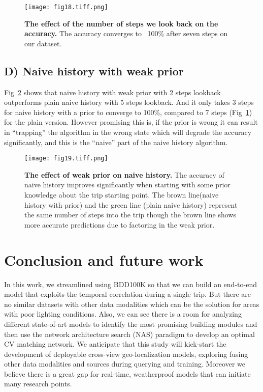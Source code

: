 \documentclass[10pt,letterpaper]{article}
\begin{document}
\begin{figure}[!ht]
  \caption{{\bf The effect of the number of steps we look back on the accuracy.} The accuracy converges to ~100\% after seven steps on our dataset.}
  \texttt{[image: fig18.tiff.png]}
  \label{fig18}
\end{figure}
\FloatBarrier

\subsection*{D) Naive history with weak prior}
Fig~\ref{fig19} shows that naive history with weak prior with 2 steps lookback outperforms plain naive history with 5 steps lookback. And it only takes 3 steps for naive history with a prior to converge to 100\%, compared to 7 steps (Fig~\ref{fig18}) for the plain version. 
However promising this is, if the prior is wrong it can result in “trapping” the algorithm in the wrong state which will degrade the accuracy significantly, and this is the “naive” part of the naive history algorithm.

\begin{figure}[!ht]
  \caption{{\bf The effect of weak prior on naive history.}  The accuracy of naive history improves significantly when starting with some prior knowledge about the trip starting point. The brown line(naive history with prior) and the green line (plain naive history) represent the same number of steps into the trip though the brown line shows more accurate predictions due to factoring in the weak prior.}
  \texttt{[image: fig19.tiff.png]}
  \label{fig19}
\end{figure}

\FloatBarrier

\section*{Conclusion and future work}
In this work, we streamlined using BDD100K so that we can build an end-to-end model that exploits the temporal correlation during a single trip. But there are no similar datasets with other data modalities which can be the solution for areas with poor lighting conditions. Also, we can see there is a room for analyzing different state-of-art models to identify the most promising building modules and then use the network architecture search (NAS) paradigm to develop an optimal CV matching network. We anticipate that this study will kick-start the development of deployable cross-view geo-localization models, exploring fusing other data modalities and sources during querying and training. Moreover we believe there is a great gap for real-time, weatherproof models that can initiate many research points.
\end{document}
